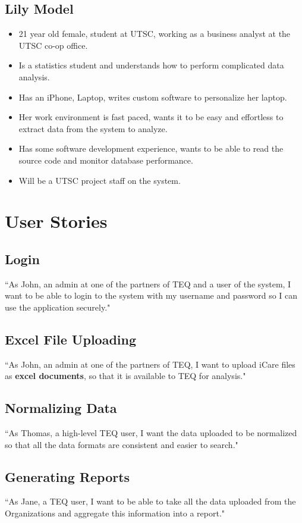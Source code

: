 \documentclass[12pt]{article}
\begin{document}
 \subsection{Lily Model}
\begin{itemize}%
\item 21 year old female, student at UTSC, working as a business analyst at the UTSC co-op office.
\item Is a statistics student and understands how to perform complicated data analysis.
\item Has an iPhone, Laptop, writes custom software to personalize her laptop.
\item Her work environment is fast paced, wants it to be easy and effortless to extract data from the system to analyze. 
\item Has some software development experience, wants to be able to read the source code and monitor database performance.
\item Will be a UTSC project staff on the system.
 \end{itemize}

\pagebreak

\section{User Stories}
\subsection{Login} ``As John, an admin at one of the partners of TEQ and a user of the system, I want to be able to login to the system with my username and password so I can use the application securely."

\subsection{Excel File Uploading}
``As John, an admin at one of the partners of TEQ, I want to upload iCare files as \textbf{excel documents}, so that it is available to TEQ for analysis."

\subsection{Normalizing Data}
``As Thomas, a high-level TEQ user, I want the data uploaded to be normalized so that all the data formats are consistent and easier to search."

\subsection{Generating Reports}
``As Jane, a TEQ user,  I want to be able to take all the data uploaded from the Organizations and aggregate this information into a report."
\end{document}
